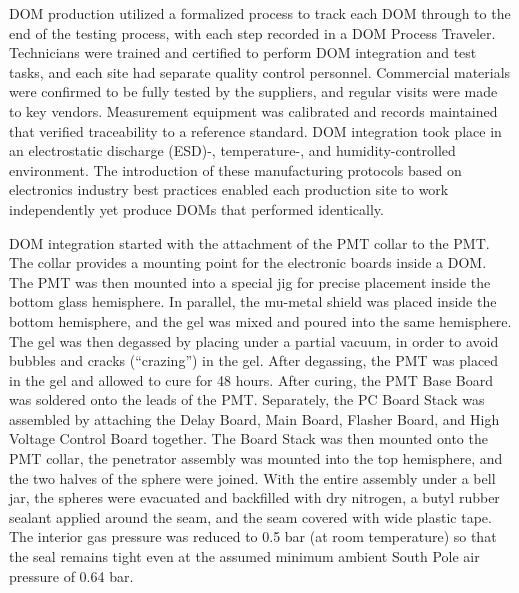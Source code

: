 DOM production utilized a formalized process to track each DOM through to
the end of the testing process, with each step recorded in a DOM Process
Traveler.  Technicians were trained and certified to perform DOM
integration and test tasks, and each site had separate quality control
personnel. Commercial materials were confirmed to be fully tested by the
suppliers, and regular visits were made to key vendors.  Measurement
equipment was calibrated and records maintained that verified
traceability to a reference standard.  DOM integration took place in
an electrostatic discharge (ESD)-, temperature-, and humidity-controlled environment.  The introduction
of these manufacturing protocols based on electronics industry best
practices enabled each production site to work independently yet
produce DOMs that performed identically.

DOM integration started with the attachment of the PMT collar
to the PMT.  The collar provides a mounting point for the electronic boards inside
a DOM. The PMT was then mounted into a special jig for precise
placement inside the bottom glass hemisphere.  In parallel, the mu-metal
shield was placed inside the bottom hemisphere, and the
gel was mixed and poured into the same hemisphere. The gel was then
degassed by placing under a partial vacuum, in order to avoid bubbles and
cracks (``crazing'') in the gel. 
After degassing, the PMT was placed in the gel and allowed to cure for 48
hours.  After curing, the PMT Base Board was soldered onto the leads of the
PMT.  Separately, the PC Board Stack was assembled by attaching the Delay
Board, Main Board, Flasher Board, and High Voltage Control Board together.
The Board Stack was then mounted onto the PMT collar, the penetrator assembly
was mounted into the top hemisphere, and the two halves of the sphere were
joined.  With the entire assembly under a bell jar, the spheres were
evacuated and backfilled with dry nitrogen, 
a butyl rubber sealant applied around the seam, and the seam covered with
wide plastic tape. The interior gas pressure was reduced to 0.5 bar (at
room temperature) so that the seal remains tight even at the assumed minimum
ambient South Pole air pressure of 0.64 bar.

